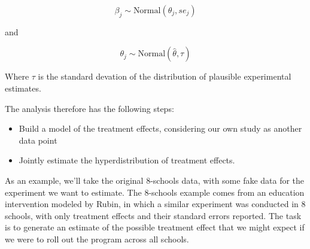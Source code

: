 \documentclass[]{book}
\providecommand{\tightlist}{%
  \setlength{\itemsep}{0pt}\setlength{\parskip}{0pt}}
\begin{document}
\[
\beta_{j} \sim \mbox{Normal}(\theta_{j}, se_{j})
\]

and

\[
\theta_{j} \sim \mbox{Normal}\left(\hat{\theta}, \tau\right)
\]

Where \(\tau\) is the standard devation of the distribution of plausible
experimental estimates.

The analysis therefore has the following steps:

\begin{itemize}
\tightlist
\item
  Build a model of the treatment effects, considering our own study as
  another data point
\item
  Jointly estimate the hyperdistribution of treatment effects.
\end{itemize}

As an example, we'll take the original 8-schools data, with some fake
data for the experiment we want to estimate. The 8-schools example comes
from an education intervention modeled by Rubin, in which a similar
experiment was conducted in 8 schools, with only treatment effects and
their standard errors reported. The task is to generate an estimate of
the possible treatment effect that we might expect if we were to roll
out the program across all schools.
\end{document}
